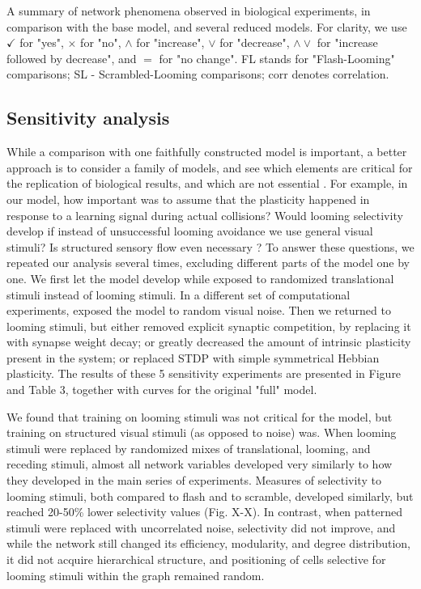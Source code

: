 \documentclass{article}
\begin{document}
\begin{table}
    
    \caption{A summary of network phenomena observed in biological experiments, in comparison with the base model, and several reduced models. For clarity, we use $\checkmark$ for "yes", $\times$ for "no", $\land$ for "increase", $\lor$ for "decrease", $\land \lor$ for "increase followed by decrease", and $=$ for "no change". FL stands for "Flash-Looming" comparisons; SL - Scrambled-Looming comparisons; corr denotes correlation.}
\end{table}
\restoregeometry

\subsection*{Sensitivity analysis}

While a comparison with one faithfully constructed model is important, a better approach is to consider a family of models, and see which elements are critical for the replication of biological results, and which are not essential \citep{linderman2017constrain,pauli2018repro}. For example, in our model, how important was to assume that the plasticity happened in response to a learning signal during actual collisions? Would  looming selectivity develop if instead of unsuccessful looming avoidance we use general visual stimuli? Is structured sensory flow even necessary \citep{triplett2018emergence}? To answer these questions, we repeated our analysis several times, excluding different parts of the model one by one. We first let the model develop while exposed to randomized translational stimuli instead of looming stimuli. In a different set of computational experiments, exposed the model to random visual noise. Then we returned to looming stimuli, but either removed explicit synaptic competition, by replacing it with synapse weight decay; or greatly decreased the amount of intrinsic plasticity present in the system; or replaced STDP with simple symmetrical Hebbian plasticity. The results of these 5 sensitivity experiments are presented in Figure and Table 3, together with curves for the original "full" model.

We found that training on looming stimuli was not critical for the model, but training on structured visual stimuli (as opposed to noise) was. When looming stimuli were replaced by randomized mixes of translational, looming, and receding stimuli, almost all network variables developed very similarly to how they developed in the main series of experiments. Measures of selectivity to looming stimuli, both compared to flash and to scramble, developed similarly, but reached 20-50\% lower selectivity values (Fig. X-X). In contrast, when patterned stimuli were replaced with uncorrelated noise, selectivity did not improve, and while the network still changed its efficiency, modularity, and degree distribution, it did not acquire hierarchical structure, and positioning of cells selective for looming stimuli within the graph remained random.
\end{document}
